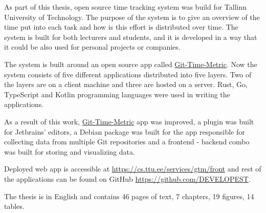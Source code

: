 As part of this thesis, open source time tracking system was build for Tallinn University of Technology.
The purpose of the system is to give an overview of the time put into each task and how is
this effort is distributed over time.
The system is built for both lecturers and students, and it is developed in a way that it
could be also used for personal projects or companies.

The system is built around an open source app called \href{https://github.com/git-time-metric/gtm}{Git-Time-Metric}.
Now the system consists of five different applications distributed into five layers.
Two of the layers are on a client machine and three are hosted on a server.
Rust, Go, TypeScript and Kotlin programming languages were used in writing the applications.

As a result of this work, \href{https://github.com/git-time-metric/gtm}{Git-Time-Metric} app was improved,
a plugin was built for Jetbrains' editors,
a Debian package was built for the app responsible for collecting data from multiple Git repositories
and a frontend - backend combo was built for storing and visualizing data.

Deployed web app is accessible at \href{https://cs.ttu.ee/services/gtm/front}{https://cs.ttu.ee/services/gtm/front}
and rest of the applications can be found on GitHub \href{https://github.com/DEVELOPEST}{https://github.com/DEVELOPEST}.

The thesis is in English and contains 46 pages of text, 7 chapters, 19 figures, 14 tables.